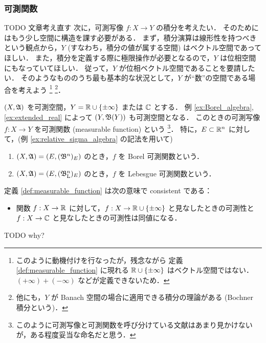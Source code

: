 \subsubsection{可測関数}

{\color{red} TODO 文章考え直す}
次に，可測写像 $f:X\to Y$ の積分を考えたい．
そのためにはもう少し空間に構造を課す必要がある．
まず，積分演算は線形性を持つべきという観点から，$Y$ (すなわち，積分の値が属する空間) はベクトル空間であってほしい．
また，積分を定義する際に極限操作が必要となるので，$Y$ は位相空間にもなっていてほしい．
従って，$Y$ が位相ベクトル空間であることを要請したい．
そのようなもののうち最も基本的な状況として，$Y$ が``数''の空間である場合を考えよう
\footnote{このように動機付けを行なったが，残念ながら
定義 \ref{def:measurable_function} に現れる $\mathbb{R}\cup\{\pm\infty\}$ はベクトル空間ではない．
$(+\infty)+(-\infty)$ などが定義できないため．}
\footnote{他にも，$Y$ が Banach 空間の場合に適用できる積分の理論がある (Bochner 積分という)．}．

\begin{definition}\label{def:measurable_function}
    $(X,\mathfrak{A})$ を可測空間，$Y=\mathbb{R}\cup\{\pm\infty\} $ または $\mathbb{C}$ とする．
    例 \ref{ex:Borel_algebra}, \ref{ex:extended_real} によって $(Y,\mathfrak{B}(Y))$ も可測空間となる．
    このときの可測写像 $f:X\to Y$ を可測関数 (measurable function) という
    \footnote{このように可測写像と可測関数を呼び分けている文献はあまり見かけないが，ある程度妥当な命名だと思う\cite{ms95741}．}．
    特に，$E\subset\mathbb{R}^n$ に対して，(例 \ref{ex:relative_sigma_algebra} の記法を用いて)
    \begin{enumerate}
        \item $(X,\mathfrak{A})=(E,(\mathfrak{B}^n)_E)$ のとき，$f$ を Borel 可測関数という．
        \item $(X,\mathfrak{A})=(E,(\mathfrak{B}_{\mathrm{L}}^n)_E)$ のとき，$f$ を Lebesgue 可測関数という．
    \end{enumerate}
\end{definition}

\begin{remark}
    定義 \ref{def:measurable_function} は次の意味で consistent である：
    \begin{itemize}
        \item 関数 $f:X\to\mathbb{R}$ に対して，$f:X\to\mathbb{R}\cup\{\pm\infty\}$ と見なしたときの可測性と
        $f:X\to\mathbb{C}$ と見なしたときの可測性は同値になる．
    \end{itemize}
    {\color{red} TODO why?}
\end{remark}

